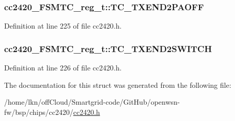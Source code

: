 \subsubsection[{\texorpdfstring{T\+C\+\_\+\+T\+X\+E\+N\+D2\+P\+A\+O\+FF}{TC_TXEND2PAOFF}}]{ cc2420\+\_\+\+F\+S\+M\+T\+C\+\_\+reg\+\_\+t\+::\+T\+C\+\_\+\+T\+X\+E\+N\+D2\+P\+A\+O\+FF}\hypertarget{structcc2420___f_s_m_t_c__reg__t_a922ada08a2a954d3a196480cc9f4fd15}{}\label{structcc2420___f_s_m_t_c__reg__t_a922ada08a2a954d3a196480cc9f4fd15}


Definition at line 225 of file cc2420.\+h.

\subsubsection[{\texorpdfstring{T\+C\+\_\+\+T\+X\+E\+N\+D2\+S\+W\+I\+T\+CH}{TC_TXEND2SWITCH}}]{ cc2420\+\_\+\+F\+S\+M\+T\+C\+\_\+reg\+\_\+t\+::\+T\+C\+\_\+\+T\+X\+E\+N\+D2\+S\+W\+I\+T\+CH}\hypertarget{structcc2420___f_s_m_t_c__reg__t_a217fc07bc5883779788350828cd19863}{}\label{structcc2420___f_s_m_t_c__reg__t_a217fc07bc5883779788350828cd19863}


Definition at line 226 of file cc2420.\+h.



The documentation for this struct was generated from the following file\+:\begin{DoxyCompactItemize}
\item 
/home/lkn/off\+Cloud/\+Smartgrid-\/code/\+Git\+Hub/openwsn-\/fw/bsp/chips/cc2420/\hyperlink{cc2420_8h}{cc2420.\+h}\end{DoxyCompactItemize}
